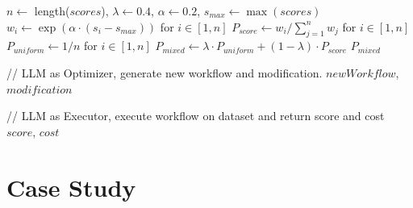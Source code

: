 \begin{algorithm}
\begin{algorithmic}[1]
    \State $n \gets$ length($scores$), $\lambda \gets 0.4$, $\alpha \gets 0.2$, $s_{max} \gets \max(scores)$
    \State $w_i \gets \exp(\alpha \cdot (s_i - s_{max}))$ for $i \in [1,n]$
    \State $P_{score} \gets w_i / \sum_{j=1}^n w_j$ for $i \in [1,n]$
    \State $P_{uniform} \gets 1/n$ for $i \in [1,n]$
    \State $P_{mixed} \gets \lambda \cdot P_{uniform} + (1-\lambda) \cdot P_{score}$
    \State \Return $P_{mixed}$
\EndProcedure

    \State // LLM as Optimizer, generate new workflow and modification.
    \State \Return $newWorkflow$, $modification$
\EndProcedure

    \State // LLM as Executor, execute workflow on dataset and return score and cost
    \State \Return $score$, $cost$
\EndProcedure
\end{algorithmic}
\end{algorithm}

\clearpage

\section{Case Study}
\label{appendix:case_study}
